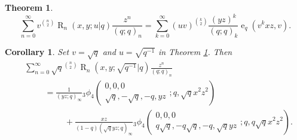 \documentclass[10pt,a4paper]{amsart}
\newtheorem{theorem}{Theorem}
\newtheorem{corollary}{Corollary}
\DeclareMathOperator{\opR}{R}
\DeclareMathOperator{\ope}{e}
\begin{document}
\begin{theorem}\label{theo_v_gen_func}
    \begin{equation}
        \sum_{n=0}^{\infty}v^{\binom{n}{2}}\opR_{n}(x,y;u|q)\frac{z^n}{(q;q)_{n}}=\sum_{k=0}^{\infty}\left(uv\right)^{\binom{k}{2}}\frac{(yz)^k}{(q;q)_{k}}\ope_{q}\left(v^{k}xz,v\right).
    \end{equation}
\end{theorem}

\begin{corollary}
Set $v=\sqrt{q}$ and $u=\sqrt{q^{-1}}$ in Theorem \ref{theo_v_gen_func}. Then
\begin{align}
    &\sum_{n=0}^{\infty}\sqrt{q}^{\binom{n}{2}}\opR_{n}(x,y;\sqrt{q^{-1}}|q)\frac{z^n}{(q;q)_{n}}\nonumber\\
    &\hspace{1cm}=\frac{1}{(yz;q)_{\infty}}{}_{3}\phi_{4}\left(
        \begin{array}{c}
            0,0,0\\
             \sqrt{q},-\sqrt{q},-q,yz
        \end{array};
        q,\sqrt{q}x^2z^2
        \right)\nonumber\\
        &\hspace{2cm}+\frac{xz}{(1-q)(\sqrt{q}yz;q)_{\infty}}{}_{3}\phi_{4}\left(
        \begin{array}{c}
            0,0,0\\
             q\sqrt{q},-q\sqrt{q},-q,\sqrt{q}yz
        \end{array};
        q,q\sqrt{q}x^2z^2
        \right).
\end{align}
\end{corollary}
\end{document}
